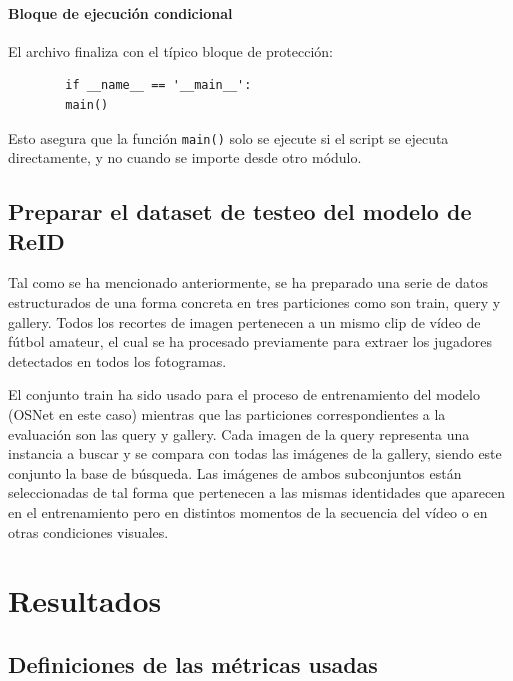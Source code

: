 \documentclass[12pt, a4paper, twoside]{article}
\begin{document}
	\paragraph{Bloque de ejecución condicional}
	
	El archivo finaliza con el típico bloque de protección:
	
	\begin{verbatim}
		if __name__ == '__main__':
		main()
	\end{verbatim}
	
	Esto asegura que la función \texttt{main()} solo se ejecute si el script se ejecuta directamente, y no cuando se importe desde otro módulo.
	
	
	
	\subsection{Preparar el dataset de testeo del modelo de ReID}
	
	Tal como se ha mencionado anteriormente, se ha preparado una serie de datos estructurados de una forma concreta en tres particiones como son train, query y gallery. Todos los recortes de imagen pertenecen a un mismo clip de vídeo de fútbol amateur, el cual se ha procesado previamente para extraer los jugadores detectados en todos los fotogramas.
	
	El conjunto train ha sido usado para el proceso de entrenamiento del modelo (OSNet en este caso) mientras que las particiones correspondientes a la evaluación son las query y gallery. Cada imagen de la query representa una instancia a buscar y se compara con todas las imágenes de la gallery, siendo este conjunto la base de búsqueda. Las imágenes de ambos subconjuntos están seleccionadas de tal forma que pertenecen a las mismas identidades que aparecen en el entrenamiento pero en distintos momentos de la secuencia del vídeo o en otras condiciones visuales.
	
	
	
	
	
	
	
	
	\section{Resultados}
	
	\subsection{Definiciones de las métricas usadas}
	
\end{document}

